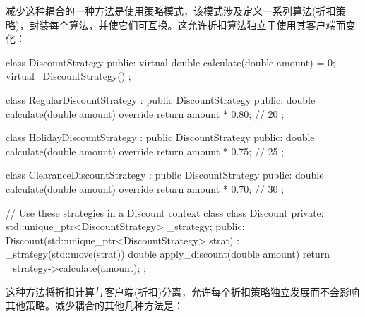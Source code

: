 
减少这种耦合的一种方法是使用策略模式，该模式涉及定义一系列算法(折扣策略)，封装每个算法，并使它们可互换。这允许折扣算法独立于使用其客户端而变化：

\begin{cpp}
class DiscountStrategy {
public:
    virtual double calculate(double amount) = 0;
    virtual ~DiscountStrategy() {}
};

class RegularDiscountStrategy : public DiscountStrategy {
public:
    double calculate(double amount) override {
        return amount * 0.80; // 20%
    }
};

class HolidayDiscountStrategy : public DiscountStrategy {
public:
    double calculate(double amount) override {
        return amount * 0.75; // 25%
    }
};

class ClearanceDiscountStrategy : public DiscountStrategy {
public:
    double calculate(double amount) override {
        return amount * 0.70; // 30%
    }
};

// Use these strategies in a Discount context class
class Discount {
private:
    std::unique_ptr<DiscountStrategy> _strategy;
public:
    Discount(std::unique_ptr<DiscountStrategy> strat) : _strategy(std::move(strat)) {}
    double apply_discount(double amount) {
        return _strategy->calculate(amount);
    }
};
\end{cpp}

这种方法将折扣计算与客户端(折扣)分离，允许每个折扣策略独立发展而不会影响其他策略。减少耦合的其他几种方法是：

